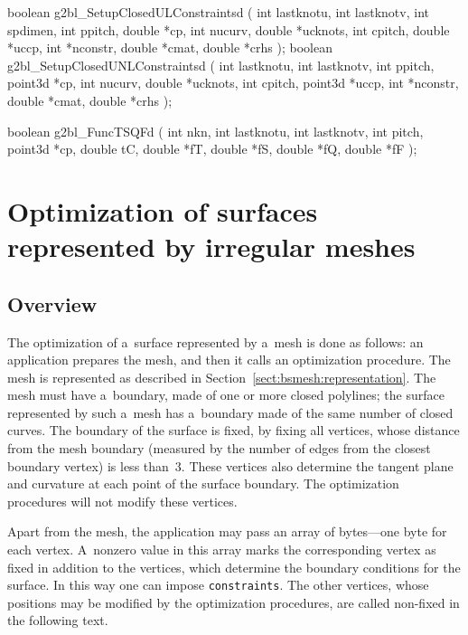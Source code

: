 \medskip
\begin{listingC}
boolean g2bl_SetupClosedULConstraintsd (
                   int lastknotu, int lastknotv, int spdimen,
                   int ppitch, double *cp,
                   int nucurv, double *ucknots,
                   int cpitch, double *uccp,   
                   int *nconstr, double *cmat, double *crhs );
boolean g2bl_SetupClosedUNLConstraintsd (
                   int lastknotu, int lastknotv,
                   int ppitch, point3d *cp,
                   int nucurv, double *ucknots,
                   int cpitch, point3d *uccp,  
                   int *nconstr, double *cmat, double *crhs );
\end{listingC}

\medskip
\begin{listingC}
boolean g2bl_FuncTSQFd ( int nkn,
                 int lastknotu, int lastknotv, int pitch, point3d *cp,
                 double tC,
                 double *fT, double *fS, double *fQ, double *fF );
\end{listingC}


\newpage
\section[Optimization of surfaces represented by irregular meshes]%
{\label{sect:g2bl:mesh:nl}Optimization of surfaces \\
represented by irregular meshes}

\subsection{Overview}

The optimization of a~surface represented by a~mesh is done as follows:
an application prepares the mesh, and then it calls an optimization
procedure. The mesh is represented as described in
Section~\ref{sect:bsmesh:representation}. The mesh must have a~boundary,
made of one or more closed polylines; the surface represented by such a~mesh
has a~boundary made of the same number of closed curves. The boundary of the
surface is fixed, by fixing all vertices, whose distance from the mesh
boundary (measured by the number of edges from the closest boundary vertex)
is less than~$3$. These vertices also determine the tangent plane and
curvature at each point of the surface boundary. The optimization procedures
will not modify these vertices.

Apart from the mesh, the application may pass an array of bytes---one byte
for each vertex. A~nonzero value in this array marks the corresponding
vertex as fixed in addition to the vertices, which determine the boundary
conditions for the surface. In this way one can impose \texttt{constraints}.
The other vertices, whose positions may be modified by the optimization
procedures, are called non-fixed in the following text.

